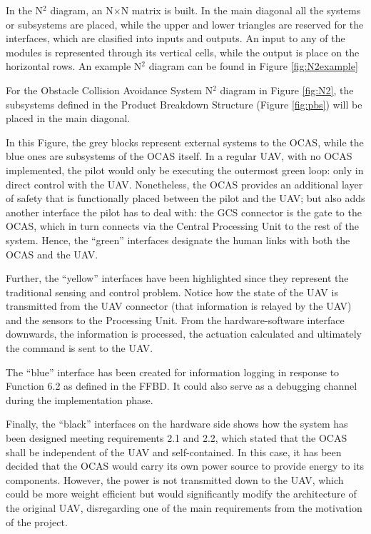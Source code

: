 In the N$^2$ diagram, an N$\times$N matrix is built.
In the main diagonal all the systems or subsystems are placed, while the upper and lower triangles are reserved for the interfaces, which are clasified into inputs and outputs.
An input to any of the modules is represented through its vertical cells, while the output is place on the horizontal rows.
An example N$^2$ diagram can be found in Figure \ref{fig:N2example}



For the Obstacle Collision Avoidance System N$^2$ diagram in Figure \ref{fig:N2}, the subsystems defined in the Product Breakdown Structure (Figure \ref{fig:pbs}) will be placed in the main diagonal.



In this Figure, the grey blocks represent external systems to the OCAS, while the blue ones are subsystems of the OCAS itself.
In a regular UAV, with no OCAS implemented, the pilot would only be executing the outermost green loop: only in direct control with the UAV.
Nonetheless, the OCAS provides an additional layer of safety that is functionally placed between the pilot and the UAV; but also adds another interface the pilot has to deal with: the GCS connector is the gate to the OCAS, which in turn connects via the Central Processing Unit to the rest of the system.
Hence, the ``green'' interfaces designate the human links with both the OCAS and the UAV.

Further, the ``yellow'' interfaces have been highlighted since they represent the traditional sensing and control problem.
Notice how the state of the UAV is transmitted from the UAV connector (that information is relayed by the UAV) and the sensors to the Processing Unit.
From the hardware-software interface downwards, the information is processed, the actuation calculated and ultimately the command is sent to the UAV. 

The ``blue'' interface has been created for information logging in response to Function 6.2 as defined in the FFBD.
It could also serve as a debugging channel during the implementation phase.

Finally, the ``black'' interfaces on the hardware side shows how the system has been designed meeting requirements 2.1 and 2.2, which stated that the OCAS shall be independent of the UAV and self-contained.
In this case, it has been decided that the OCAS would carry its own power source to provide energy to its components.
However, the power is not transmitted down to the UAV, which could be more weight efficient but would significantly modify the architecture of the original UAV, disregarding one of the main requirements from the motivation of the project.


